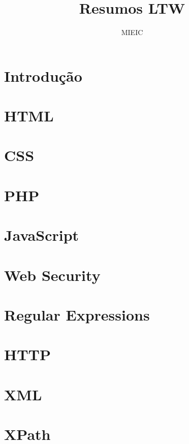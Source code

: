 \documentclass{article}
\title{Resumos LTW}
\author{MIEIC}
\begin{document}
  
\maketitle

\tableofcontents

\section{Introdução}



\section{HTML}



\section{CSS}



\section{PHP}



\section{JavaScript}



\section{Web Security}



\section{Regular Expressions}



\section{HTTP}



\section{XML}



\section{XPath}


\end{document}
